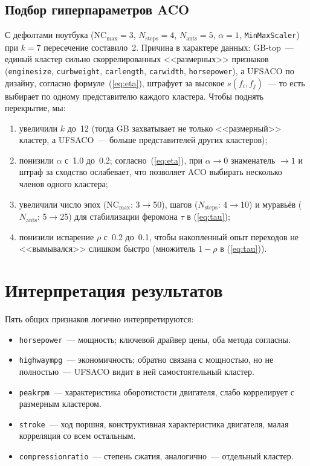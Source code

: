 \documentclass[12pt,a4paper]{article}
\begin{document}
\subsection{Подбор гиперпараметров ACO}\label{sec:tune}
С дефолтами ноутбука ($\text{NC}_{\max}=3$, $N_{\text{steps}}=4$,
$N_{\text{ants}}=5$, $\alpha=1$, \texttt{MinMaxScaler}) при $k=7$
пересечение составило~2. Причина в характере данных: GB-top~--- единый
кластер сильно скоррелированных <<размерных>> признаков
(\texttt{enginesize}, \texttt{curbweight}, \texttt{carlength},
\texttt{carwidth}, \texttt{horsepower}), а UFSACO по дизайну, согласно
формуле~(\ref{eq:eta}), штрафует за высокое $s(f_i,f_j)$~--- то есть
выбирает по одному представителю каждого кластера. Чтобы поднять
перекрытие, мы:
\begin{enumerate}\setlength\itemsep{0pt}
  \item увеличили $k$ до~12 (тогда GB захватывает не только <<размерный>>
        кластер, а UFSACO~--- больше представителей других кластеров);
  \item понизили $\alpha$ с~1.0 до~0.2; согласно~(\ref{eq:eta}), при
        $\alpha \to 0$ знаменатель $\to 1$ и штраф за сходство
        ослабевает, что позволяет ACO выбирать несколько членов одного
        кластера;
  \item увеличили число эпох ($\text{NC}_{\max}$: 3$\to$50), шагов
        ($N_{\text{steps}}$: 4$\to$10) и муравьёв ($N_{\text{ants}}$:
        5$\to$25) для стабилизации феромона $\tau$ в (\ref{eq:tau});
  \item понизили испарение $\rho$ с~0.2 до~0.1, чтобы накопленный опыт
        переходов не <<вымывался>> слишком быстро (множитель $1-\rho$ в
        (\ref{eq:tau})).
\end{enumerate}

\section{Интерпретация результатов}

Пять общих признаков логично интерпретируются:
\begin{itemize}\setlength\itemsep{0pt}
  \item \texttt{horsepower}~--- мощность; ключевой драйвер цены, оба
        метода согласны.
  \item \texttt{highwaympg}~--- экономичность; обратно связана с
        мощностью, но не полностью~--- UFSACO видит в ней
        самостоятельный кластер.
  \item \texttt{peakrpm}~--- характеристика оборотистости двигателя,
        слабо коррелирует с размерным кластером.
  \item \texttt{stroke}~--- ход поршня, конструктивная характеристика
        двигателя, малая корреляция со всем остальным.
  \item \texttt{compressionratio}~--- степень сжатия, аналогично~---
        отдельный кластер.
\end{itemize}
\end{document}
